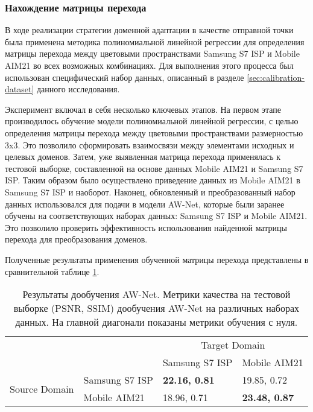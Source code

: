\subsubsection{Нахождение матрицы перехода}

В ходе реализации стратегии доменной адаптации в качестве отправной точки была применена методика полиномиальной линейной регрессии для определения матрицы перехода между цветовыми пространствами Samsung S7 ISP и Mobile AIM21 во всех возможных комбинациях. Для выполнения этого процесса был использован специфический набор данных, описанный в разделе \ref{sec:calibration-dataset} данного исследования.

Эксперимент включал в себя несколько ключевых этапов. На первом этапе производилось обучение модели полиномиальной линейной регрессии, с целью определения матрицы перехода между цветовыми пространствами размерностью 3x3. Это позволило сформировать взаимосвязи между элементами исходных и целевых доменов. Затем, уже выявленная матрица перехода применялась к тестовой выборке, составленной на основе данных Mobile AIM21 и Samsung S7 ISP. Таким образом было осуществлено приведение данных из Mobile AIM21 в Samsung S7 ISP и наоборот. Наконец, обновленный и преобразованный набор данных использовался для подачи в модели AW-Net, которые были заранее обучены на соответствующих наборах данных: Samsung S7 ISP и Mobile AIM21. Это позволило проверить эффективность использования найденной матрицы перехода для преобразования доменов.

Полученные результаты применения обученной матрицы перехода представлены в сравнительной таблице \ref{tab:cst}.

\begin{table}[H]
    \caption{Результаты дообучения AW-Net. Метрики качества на тестовой выборке (PSNR, SSIM) дообучения AW-Net на различных наборах данных. На главной диагонали показаны метрики обучения с нуля.}\label{tab:cst}
    \begin{tabular}{|ll|ll|}
        \hline
        \multicolumn{2}{|l|}{\multirow{2}{*}{}}                               & \multicolumn{2}{c|}{Target Domain}                               \\ \cline{3-4} 
        \multicolumn{2}{|l|}{}                                                & \multicolumn{1}{l|}{Samsung S7 ISP}       & Mobile AIM21         \\ \hline
        \multicolumn{1}{|c|}{\multirow{2}{*}{Source Domain}} & Samsung S7 ISP & \multicolumn{1}{l|}{\textbf{22.16, 0.81}} & 19.85, 0.72          \\ \cline{2-4} 
        \multicolumn{1}{|c|}{}                               & Mobile AIM21   & \multicolumn{1}{l|}{18.96, 0.71}          & \textbf{23.48, 0.87} \\ \hline
    \end{tabular}
\end{table}

